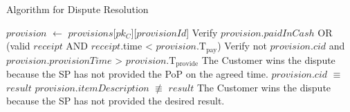 \documentclass[pdftex,twocolumn,epjc3]{svjour3}
\newcommand{\normal}{\mathrm{n}}
\newcommand{\dispute}{\mathrm{d}}
\newcommand{\abnormal}{\overline{\mathrm{n}}}
\newcommand{\abdispute}{\overline{\mathrm{d}}}
\begin{document}
\begin{algorithm}
\caption{Algorithm for Dispute Resolution}
\label{alg:disputeResolution}
\begin{algorithmic}[1]
    
    \State $provision$ $\gets$ $provisions$[$pk_C$][$provisionId$]
    \State Verify $provision$.$paidInCash$ OR  (valid $receipt$ AND $receipt$.time < $provision$.$\mathrm{T}_\mathrm{pay}$)
    \State Verify not $provision$.$cid$ and $provision$.$provisionTime$ > $provision$.$\mathrm{T}_\mathrm{provide}$
    \State \Return The Customer wins the dispute because the SP has not provided the PoP on the agreed time.
    \EndIf
        \State $provision$.$cid$ $\equiv$ $result$
        \State $provision$.$itemDescription$ $\not\equiv$ $result$
        \State \Return The Customer wins the dispute because the SP has not provided the desired result.
    \EndIf
\EndFunction
\end{algorithmic}
\end{algorithm}




\end{document}
